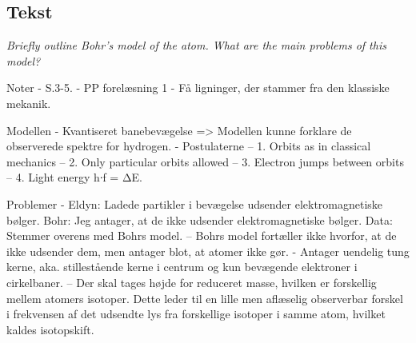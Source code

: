 \subsection{Tekst}

\emph{Briefly outline Bohr's model of the atom. What are the main problems of this model?}

Noter
- S.3-5.
- PP forelæsning 1
- Få ligninger, der stammer fra den klassiske mekanik.

Modellen
- Kvantiseret banebevægelse => Modellen kunne forklare de observerede spektre for hydrogen.
- Postulaterne
-- 1. Orbits as in classical mechanics
-- 2. Only particular orbits allowed
-- 3. Electron jumps between orbits
-- 4. Light energy h∙f = ΔE.

Problemer
- Eldyn: Ladede partikler i bevægelse udsender elektromagnetiske bølger. Bohr: Jeg antager, at de ikke udsender elektromagnetiske bølger. Data: Stemmer overens med Bohrs model.
-- Bohrs model fortæller ikke hvorfor, at de ikke udsender dem, men antager blot, at atomer ikke gør.
- Antager uendelig tung kerne, aka. stillestående kerne i centrum og kun bevægende elektroner i cirkelbaner.
-- Der skal tages højde for reduceret masse, hvilken er forskellig mellem atomers isotoper. Dette leder til en lille men aflæselig observerbar forskel i frekvensen af det udsendte lys fra forskellige isotoper i samme atom, hvilket kaldes isotopskift.